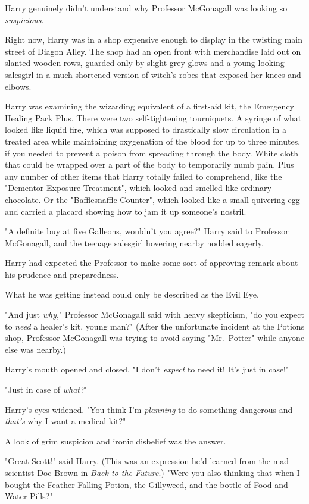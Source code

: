Harry genuinely didn't understand why Professor McGonagall was looking so
\emph{suspicious}.

Right now, Harry was in a shop expensive enough to display in the twisting main
street of Diagon Alley. The shop had an open front with merchandise laid out on
slanted wooden rows, guarded only by slight grey glows and a young-looking
salesgirl in a much-shortened version of witch's robes that exposed her knees
and elbows.

Harry was examining the wizarding equivalent of a first-aid kit, the Emergency
Healing Pack Plus. There were two self-tightening tourniquets. A syringe of
what looked like liquid fire, which was supposed to drastically slow
circulation in a treated area while maintaining oxygenation of the blood for up
to three minutes, if you needed to prevent a poison from spreading through the
body. White cloth that could be wrapped over a part of the body to temporarily
numb pain. Plus any number of other items that Harry totally failed to
comprehend, like the "Dementor Exposure Treatment", which looked and smelled
like ordinary chocolate. Or the "Bafflesnaffle Counter", which looked like a
small quivering egg and carried a placard showing how to jam it up someone's
nostril.

"A definite buy at five Galleons, wouldn't you agree?" Harry said to Professor
McGonagall, and the teenage salesgirl hovering nearby nodded eagerly.

Harry had expected the Professor to make some sort of approving remark about
his prudence and preparedness.

What he was getting instead could only be described as the Evil Eye.

"And just \emph{why}," Professor McGonagall said with heavy skepticism, "do you
expect to \emph{need} a healer's kit, young man?" (After the unfortunate
incident at the Potions shop, Professor McGonagall was trying to avoid saying
"Mr.~Potter" while anyone else was nearby.)

Harry's mouth opened and closed. "I don't \emph{expect} to need it! It's just
in case!"

"Just in case of \emph{what?}"

Harry's eyes widened. "You think I'm \emph{planning} to do something dangerous
and \emph{that's} why I want a medical kit?"

A look of grim suspicion and ironic disbelief was the answer.

"Great Scott!" said Harry. (This was an expression he'd learned from the mad
scientist Doc Brown in \emph{Back to the Future}.) "Were you also thinking that
when I bought the Feather-Falling Potion, the Gillyweed, and the bottle of Food
and Water Pills?"

